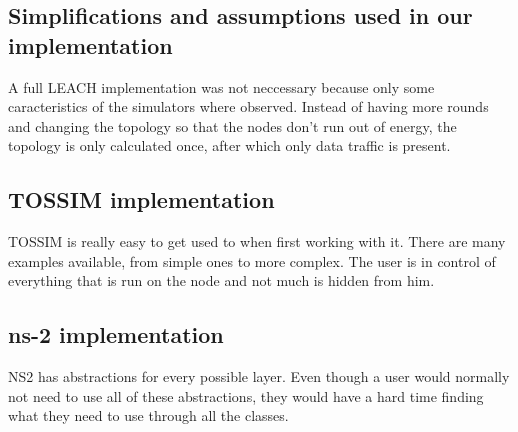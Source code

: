  

\subsection{Simplifications and assumptions used in our implementation}
A full LEACH implementation was not neccessary because only some caracteristics of
the simulators where observed. Instead of having more rounds and changing the topology
so that the nodes don't run out of energy, the topology is only calculated once, after
which only data traffic is present.
\subsection{TOSSIM implementation}
TOSSIM is really easy to get used to when first working with it. There are many examples
available, from simple ones to more complex. The user is in control of everything that is
run on the node and not much is hidden from him.

\subsection{ns-2 implementation}
NS2 has abstractions for every possible layer. Even though a user would normally not need to use
all of these abstractions, they would have a hard time finding what they need to use through all 
the classes.

